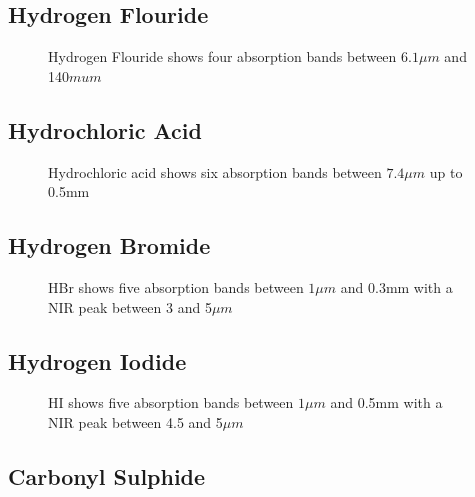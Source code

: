 \documentclass[12pt]{article}
\begin{document}
\subsection{Hydrogen Flouride}

\vspace*{11.5cm}
\begin{figure}[htb]
\caption{Hydrogen Flouride shows four absorption bands between  $6.1 \mu m$
 and 140$mu m$}
\end{figure}
\newpage


\subsection{Hydrochloric Acid}

\vspace*{11.5cm}
\begin{figure}[htb]
\caption{Hydrochloric acid shows six absorption bands between  $7.4 \mu m$
 up to 0.5mm}
\end{figure}
\newpage

\subsection{Hydrogen Bromide}

\vspace*{11.5cm}
\begin{figure}[htb]
\caption{HBr shows five absorption bands between  $1\mu m$
 and  0.3mm with a NIR peak between 3 and 5$\mu m$}
\end{figure}
\newpage


\subsection{Hydrogen Iodide}

\vspace*{11.5cm}
\begin{figure}[htb]
\caption{HI shows five absorption bands between  $1\mu m$
 and  0.5mm with a NIR peak between 4.5 and 5$\mu m$}
\end{figure}
\newpage


\subsection{Carbonyl Sulphide}
\end{document}
